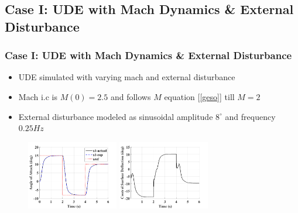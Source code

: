 \documentclass[table,10pt,red]{beamer}	%
\begin{document}
\subsection{Case I: UDE with Mach Dynamics \& External Disturbance}
\begin{frame}
\frametitle{Case I: UDE with Mach Dynamics \& External Disturbance}

\begin{itemize}
	\item UDE simulated with varying mach and external disturbance
	\item Mach i.c is $M(0) = 2.5$ and follows $M$ equation [\ref{geso}] till $M = 2$
	\item External disturbance modeled as sinusoidal amplitude $8^\circ$ and frequency $0.25 Hz$
\end{itemize}

\begin{figure}
\includegraphics[width=4cm]{1_ude_varying-mach_x1}
\includegraphics[width=4cm]{2_ude_varying-mach_control}
\end{figure}


\end{frame}	
\end{document}
